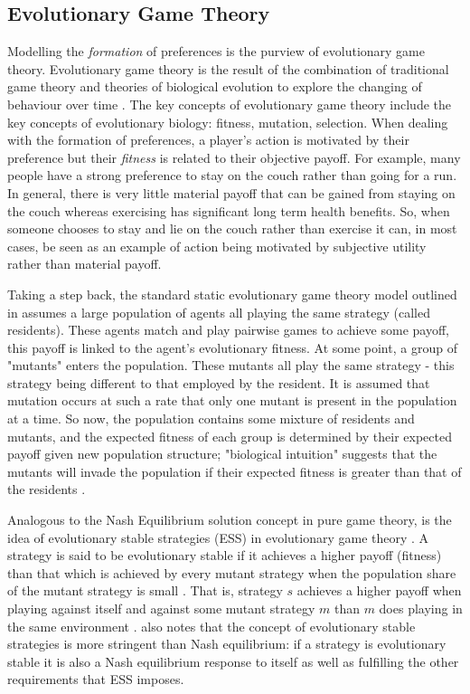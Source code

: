 \documentclass[11pt]{book}
\newcommand*{\np}{\par\noindent\newline}
\begin{document}
\subsection{Evolutionary Game Theory}\label{evo_games}
Modelling the \textit{formation} of preferences is the purview of evolutionary game theory. 
Evolutionary game theory is the result of the combination of traditional game theory and theories of biological evolution to explore the changing of behaviour over time \citep{tanimoto_fundamentals_2015}. 
The key concepts of evolutionary game theory include the key concepts of evolutionary biology: fitness, mutation, selection. 
When dealing with the formation of preferences, a player's action is motivated by their preference but their \textit{fitness} is related to their objective payoff. 
For example, many people have a strong preference to stay on the couch rather than going for a run. 
In general, there is very little material payoff that can be gained from staying on the couch whereas exercising has significant long term health benefits. 
So, when someone chooses to stay and lie on the couch rather than exercise it can, in most cases, be seen as an example of action being motivated by subjective utility rather than material payoff.

\np Taking a step back, the standard static evolutionary game theory model outlined in \citet{weibull_introduction_1992}
assumes a large population of agents all playing the same strategy (called residents). These agents match and play
pairwise games to achieve some payoff, this payoff is linked to the agent's evolutionary fitness. At some point, a group
of "mutants" enters the population. These mutants all play the same strategy - this strategy being different to that
employed by the resident. It is assumed that mutation occurs at such a rate that only one mutant is present in the
population at a time. So now, the population contains some mixture of residents and mutants, and the expected fitness of
each group is determined by their expected payoff given new population structure; "biological intuition" suggests that
the mutants will invade the population if their expected fitness is greater than that of the residents \citep[~p. 9]{weibull_introduction_1992}.

\np Analogous to the Nash Equilibrium solution concept in pure game theory, is the idea of evolutionary stable
strategies (ESS) in evolutionary game theory \citep{smith_logic_1973}. A strategy is said to be evolutionary stable if it achieves a higher
payoff (fitness) than that which is achieved by every mutant strategy when the population share of the mutant strategy
is small \citep{weibull_introduction_1992}. That is, strategy $s$ achieves a higher payoff when playing against itself
and against some mutant strategy $m$ than $m$ does playing in the same environment \citep{shoham_multiagent_2008}. 
\citet{weibull_introduction_1992} also notes that the concept of evolutionary stable strategies is more stringent than Nash equilibrium: if a strategy is evolutionary stable it is also a Nash equilibrium response to itself
as well as fulfilling the other requirements that ESS imposes.
\end{document}
